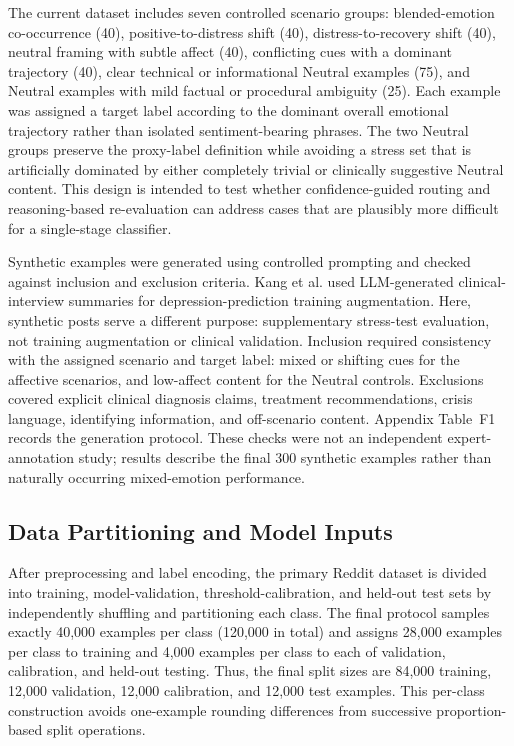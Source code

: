 \documentclass{ieeeaccess}
\begin{document}
The current dataset includes seven controlled scenario groups: blended-emotion co-occurrence (40), positive-to-distress shift (40), distress-to-recovery shift (40), neutral framing with subtle affect (40), conflicting cues with a dominant trajectory (40), clear technical or informational Neutral examples (75), and Neutral examples with mild factual or procedural ambiguity (25). Each example was assigned a target label according to the dominant overall emotional trajectory rather than isolated sentiment-bearing phrases. The two Neutral groups preserve the proxy-label definition while avoiding a stress set that is artificially dominated by either completely trivial or clinically suggestive Neutral content. This design is intended to test whether confidence-guided routing and reasoning-based re-evaluation can address cases that are plausibly more difficult for a single-stage classifier.

Synthetic examples were generated using controlled prompting and checked against inclusion and exclusion criteria. Kang et al. \cite{ref19} used LLM-generated clinical-interview summaries for depression-prediction training augmentation. Here, synthetic posts serve a different purpose: supplementary stress-test evaluation, not training augmentation or clinical validation. Inclusion required consistency with the assigned scenario and target label: mixed or shifting cues for the affective scenarios, and low-affect content for the Neutral controls. Exclusions covered explicit clinical diagnosis claims, treatment recommendations, crisis language, identifying information, and off-scenario content. Appendix Table~F1 records the generation protocol. These checks were not an independent expert-annotation study; results describe the final 300 synthetic examples rather than naturally occurring mixed-emotion performance.

\subsection{Data Partitioning and Model Inputs}

After preprocessing and label encoding, the primary Reddit dataset is divided into training, model-validation, threshold-calibration, and held-out test sets by independently shuffling and partitioning each class. The final protocol samples exactly 40,000 examples per class (120,000 in total) and assigns 28,000 examples per class to training and 4,000 examples per class to each of validation, calibration, and held-out testing. Thus, the final split sizes are 84,000 training, 12,000 validation, 12,000 calibration, and 12,000 test examples. This per-class construction avoids one-example rounding differences from successive proportion-based split operations.
\end{document}
